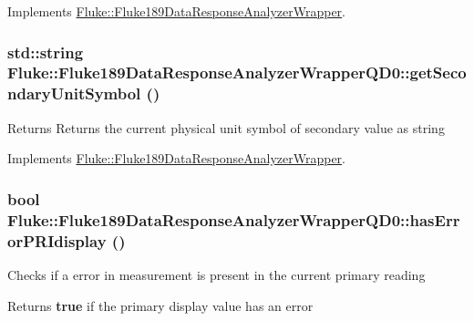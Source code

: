 Implements \hyperlink{classFluke_1_1Fluke189DataResponseAnalyzerWrapper_ab7559dd16cb4c1bda20ac54b4f93865b}{Fluke::Fluke189DataResponseAnalyzerWrapper}.\hypertarget{classFluke_1_1Fluke189DataResponseAnalyzerWrapperQD0_af7a5731fbbd6ac2a7ab2a8d0a9f2ffe6}{
\subsubsection[{getSecondaryUnitSymbol}]{\setlength{\rightskip}{0pt plus 5cm}std::string Fluke::Fluke189DataResponseAnalyzerWrapperQD0::getSecondaryUnitSymbol ()}}
\label{classFluke_1_1Fluke189DataResponseAnalyzerWrapperQD0_af7a5731fbbd6ac2a7ab2a8d0a9f2ffe6}
\begin{DoxyReturn}{Returns}
Returns the current physical unit symbol of secondary value as string 
\end{DoxyReturn}


Implements \hyperlink{classFluke_1_1Fluke189DataResponseAnalyzerWrapper_ab64cf61c2461f5150b0a0ad31ba689cc}{Fluke::Fluke189DataResponseAnalyzerWrapper}.\hypertarget{classFluke_1_1Fluke189DataResponseAnalyzerWrapperQD0_a173f4602b71d7d415e11aa1f1826d3f0}{
\subsubsection[{hasErrorPRIdisplay}]{\setlength{\rightskip}{0pt plus 5cm}bool Fluke::Fluke189DataResponseAnalyzerWrapperQD0::hasErrorPRIdisplay ()}}
\label{classFluke_1_1Fluke189DataResponseAnalyzerWrapperQD0_a173f4602b71d7d415e11aa1f1826d3f0}
Checks if a error in measurement is present in the current primary reading \begin{DoxyReturn}{Returns}
{\bfseries true} if the primary display value has an error 
\end{DoxyReturn}


